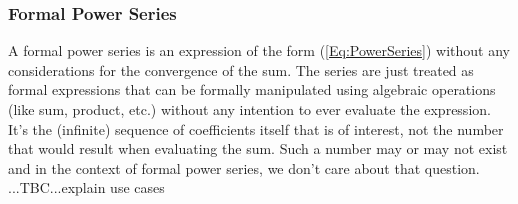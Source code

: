 %

% 



\subsubsection{Formal Power Series}
A formal power series is an expression of the form (\ref{Eq:PowerSeries}) without any considerations for the convergence of the sum. The series are just treated as formal expressions that can be formally manipulated using algebraic operations (like sum, product, etc.) without any intention to ever evaluate the expression. It's the (infinite) sequence of coefficients itself that is of interest, not the number that would result when evaluating the sum. Such a number may or may not exist and in the context of formal power series, we don't care about that question. ...TBC...explain use cases


